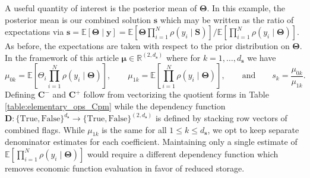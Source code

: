 \documentclass[graybox]{svmult}
\begin{document}
A useful quantity of interest is the posterior mean of $\boldsymbol{\Theta}$. In this example, the posterior mean is our combined solution $\boldsymbol{s}$ which may be written as the ratio of expectations via $\boldsymbol{s} = \mathbb{E}\left[\boldsymbol{\Theta} \mid \boldsymbol{y}\right] = \mathbb{E}\left[\boldsymbol{\Theta} \prod_{i=1}^{N} \rho(y_i \mid \boldsymbol{S})\right]/\mathbb{E}\left[\prod_{i=1}^{N} \rho(y_i \mid \boldsymbol{\Theta})\right]$. As before, the expectations are taken with respect to the prior distribution on $\boldsymbol{\Theta}$. In the framework of this article $\boldsymbol{\mu} \in \mathbb{R}^{(2, d_{\boldsymbol{s}})}$ where for $k=1,\dots,d_{\boldsymbol{s}}$ we have 
$$\mu_{0k} = \mathbb{E}\left[\Theta_i \prod_{i=1}^{N} \rho(y_i \mid \boldsymbol{\Theta})\right], \qquad \mu_{1k} = \mathbb{E}\left[\prod_{i=1}^{N} \rho(y_i \mid \boldsymbol{\Theta})\right], \qquad \text{and} \qquad s_k = \frac{\mu_{0k}}{\mu_{1k}}.$$
Defining $\boldsymbol{C}^-$ and $\boldsymbol{C}^+$ follow from vectorizing the quotient forms in Table \ref{table:elementary_ops_Cpm} while the dependency function $\boldsymbol{D}: \{\text{True},\text{False}\}^{d_{\boldsymbol{s}}} \to \{\text{True},\text{False}\}^{(2, d_{\boldsymbol{s}})}$ is defined by stacking row vectors of combined flags. While $\mu_{1k}$ is the same for all $1 \leq k \leq d_{\boldsymbol{s}}$, we opt to keep separate denominator estimates for each coefficient. Maintaining only a single estimate of $\mathbb{E}\left[\prod_{i=1}^{N} \rho(y_i \mid \boldsymbol{\Theta})\right]$ would require a different dependency function which removes economic function evaluation in favor of reduced storage. 

\end{document}
